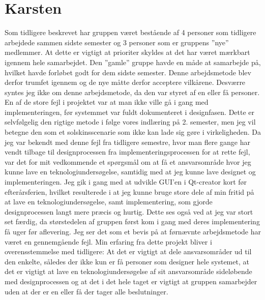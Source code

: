 \section{Karsten}
Som tidligere beskrevet har gruppen været bestående af 4 personer som tidligere arbejdede sammen sidste semester og 3 personer som er gruppens ''nye'' medlemmer. At dette er vigtigt at prioriter skyldes at det har været mærkbart igennem hele samarbejdet. Den ''gamle'' gruppe havde en måde at samarbejde på, hvilket havde forløbet godt for dem sidste semester. Denne arbejdsmetode blev derfor trumfet igennem og de nye måtte derfor acceptere vilkårene. Desværre syntes jeg ikke om denne arbejdsmetode, da den var styret af en eller få personer. En af de store fejl i projektet var at man ikke ville gå i gang med implementeringen, før systemmet var fuldt dokumenteret i designfasen. Dette er selvfølgelig den rigtige metode i følge vores indlæring på 2. semester, men jeg vil betegne den som et solskinsscenarie som ikke kan lade sig gøre i virkeligheden. Da jeg var bekendt med denne fejl fra tidligere semestre, hvor man flere gange har vendt tilbage til designprocessen fra implementeringsprocessen for at rette fejl, var det for mit vedkommende et spørgsmål om at få et ansvarsområde hvor jeg kunne lave en teknologiundersøgelse, samtidig med at jeg kunne lave designet og implementeringen. Jeg gik i gang med at udvikle GUI'en i Qt-creator kort før efterårsferien, hvilket resulterede i at jeg kunne bruge store dele af min fritid på at lave en teknologiundersøgelse, samt implementering, som gjorde designprocessen langt mere præcis og hurtig. Dette ses også ved at jeg var stort set færdig, da størstedelen af gruppen først kom i gang med deres implementering få uger før aflevering. Jeg ser det som et bevis på at førnævnte arbejdsmetode har været en gennemgående fejl. Min erfaring fra dette projekt bliver i overensstemmelse med tidligere: At det er vigtigt at dele ansvarsområder ud til den enkelte, således der ikke kun er få personer som designer hele systemet, at det er vigtigt at lave en teknologiundersøgelse af sit ansvarsområde sideløbende med designprocessen og at det i det hele taget er vigtigt at gruppen samarbejder uden at der er en eller få der tager alle beslutninger.    